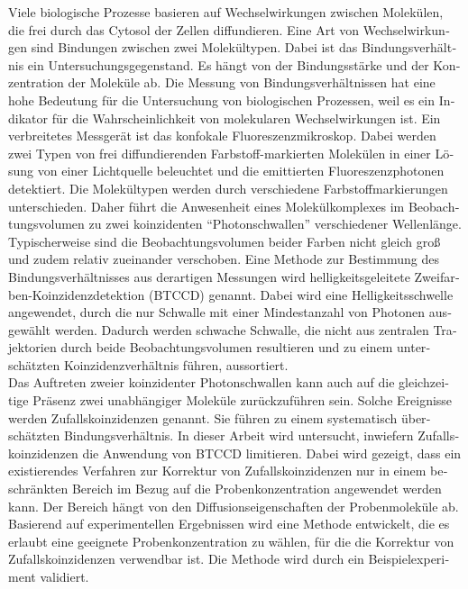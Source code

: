 \begin{otherlanguage}{ngerman}
Viele biologische Prozesse basieren auf Wechselwirkungen zwischen Molekülen, die frei durch das Cytosol der Zellen diffundieren. Eine Art von Wechselwirkungen sind Bindungen zwischen zwei Molekültypen. Dabei ist das Bindungsverhältnis ein Untersuchungsgegenstand. Es hängt von der Bindungsstärke und der Konzentration der Moleküle ab. Die Messung von Bindungsverhältnissen hat eine hohe Bedeutung für die Untersuchung von biologischen Prozessen, weil es ein Indikator für die Wahrscheinlichkeit von molekularen Wechselwirkungen ist. Ein verbreitetes Messgerät ist das konfokale Fluoreszenzmikroskop. Dabei werden zwei Typen von frei diffundierenden Farbstoff-markierten Molekülen in einer Lösung von einer Lichtquelle beleuchtet und die emittierten Fluoreszenzphotonen detektiert. Die Molekültypen werden durch verschiedene Farbstoffmarkierungen unterschieden. Daher führt die Anwesenheit eines Molekülkomplexes im Beobachtungsvolumen zu zwei koinzidenten \enquote{Photonschwallen} verschiedener Wellenlänge. Typischerweise sind die Beobachtungsvolumen beider Farben nicht gleich groß und zudem relativ zueinander verschoben. Eine Methode zur Bestimmung des Bindungsverhältnisses aus derartigen Messungen wird helligkeitsgeleitete Zweifarben-Ko\-in\-zi\-denz\-de\-tek\-tion (BTCCD) genannt. Dabei wird eine Helligkeitsschwelle angewendet, durch die nur Schwalle mit einer Mindestanzahl von Photonen ausgewählt werden. Dadurch werden schwache Schwalle, die nicht aus zentralen Trajektorien durch beide Beobachtungsvolumen resultieren und zu einem unterschätzten Koinzidenzverhältnis führen, aussortiert. \\

Das Auftreten zweier koinzidenter Photonschwallen kann auch auf die gleichzeitige Präsenz zwei unabhängiger Moleküle zurückzuführen sein. Solche Ereignisse werden Zufallskoinzidenzen genannt. Sie führen zu einem systematisch überschätzten Bindungsverhältnis. In dieser Arbeit wird untersucht, inwiefern Zufallskoinzidenzen die Anwendung von \gls{BTCCD} limitieren. Dabei wird gezeigt, dass ein existierendes Verfahren zur Korrektur von Zufallskoinzidenzen nur in einem beschränkten Bereich im Bezug auf die Probenkonzentration angewendet werden kann. Der Bereich hängt von den Diffusionseigenschaften der Probenmoleküle ab. Basierend auf experimentellen Ergebnissen wird eine Methode entwickelt, die es erlaubt eine geeignete Probenkonzentration zu wählen, für die die Korrektur von Zufallskoinzidenzen verwendbar ist. Die Methode wird durch ein Beispielexperiment validiert. \\


\end{otherlanguage}
